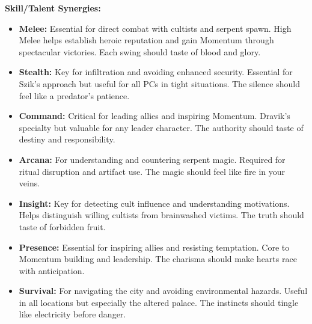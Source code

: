 \documentclass[11pt]{article}
\begin{document}
\textbf{Skill/Talent Synergies:}
\begin{itemize}
\item \textbf{Melee:} Essential for direct combat with cultists and serpent spawn. High Melee helps establish heroic reputation and gain Momentum through spectacular victories. Each swing should taste of blood and glory.
\item \textbf{Stealth:} Key for infiltration and avoiding enhanced security. Essential for Szik's approach but useful for all PCs in tight situations. The silence should feel like a predator's patience.
\item \textbf{Command:} Critical for leading allies and inspiring Momentum. Dravik's specialty but valuable for any leader character. The authority should taste of destiny and responsibility.
\item \textbf{Arcana:} For understanding and countering serpent magic. Required for ritual disruption and artifact use. The magic should feel like fire in your veins.
\item \textbf{Insight:} Key for detecting cult influence and understanding motivations. Helps distinguish willing cultists from brainwashed victims. The truth should taste of forbidden fruit.
\item \textbf{Presence:} Essential for inspiring allies and resisting temptation. Core to Momentum building and leadership. The charisma should make hearts race with anticipation.
\item \textbf{Survival:} For navigating the city and avoiding environmental hazards. Useful in all locations but especially the altered palace. The instincts should tingle like electricity before danger.
\end{itemize}
\end{document}
